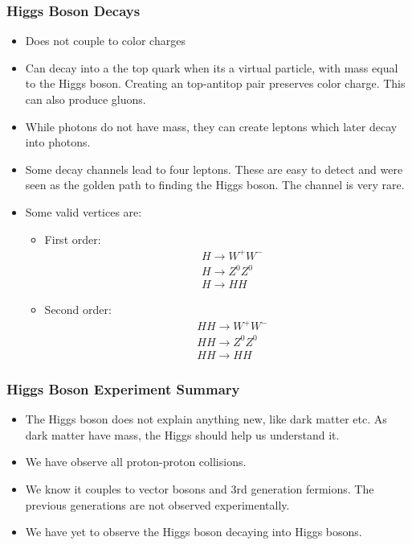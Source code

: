 \subsubsection{Higgs Boson Decays}
\begin{itemize}
  \item Does not couple to color charges
  \item Can decay into a the top quark when its a virtual particle, with mass equal to the Higgs boson. Creating an top-antitop pair preserves color charge. This can also produce gluons. 
  \item While photons do not have mass, they can create leptons which later decay into photons.
  \item Some decay channels lead to four leptons. These are easy to detect and were seen as the golden path to finding the Higgs boson. The channel is very rare. 
  \item Some valid vertices are: 
  \begin{itemize}
    \item First order:
    \begin{align}
      &H → W^{+} W^{-} \\
      &H → Z^{0} Z^{0} \\
      &H → HH
    \end{align}
    \item Second order:
    \begin{align}
      &HH → W^{+} W^{-} \\
      &HH → Z^{0} Z^{0} \\
      &HH → HH
    \end{align}
  \end{itemize}
\end{itemize}

\subsubsection{Higgs Boson Experiment Summary}
\begin{itemize}
  \item The Higgs boson does not explain anything new, like dark matter etc. As dark matter have mass, the Higgs should help us understand it. 
  \item We have observe all proton-proton collisions. 
  \item We know it couples to vector bosons and 3rd generation fermions. The previous generations are not observed experimentally. 
  \item We have yet to observe the Higgs boson decaying into Higgs bosons.
\end{itemize}